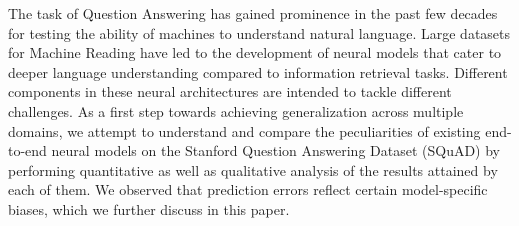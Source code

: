 The task of Question Answering has gained prominence in the past few decades for testing the ability of machines to understand natural language. Large datasets for Machine Reading have led to the development of neural models that cater to deeper language understanding compared to information retrieval tasks. Different components in these neural architectures are intended to tackle different challenges. As a first step towards achieving generalization across multiple domains, we attempt to understand and compare the peculiarities of existing end-to-end neural models on the Stanford Question Answering Dataset (SQuAD) by performing quantitative as well as qualitative analysis of the results attained by each of them. We observed that prediction errors reflect certain model-specific biases, which we further discuss in this paper.
